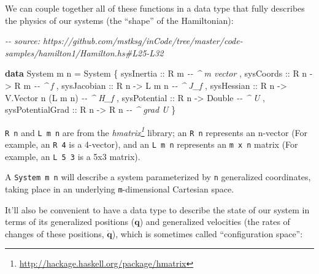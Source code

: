 \documentclass[]{article}
\newenvironment{Shaded}{}{}
\newcommand{\CommentTok}[1]{\textcolor[rgb]{0.38,0.63,0.69}{\textit{#1}}}
\newcommand{\DataTypeTok}[1]{\textcolor[rgb]{0.56,0.13,0.00}{#1}}
\newcommand{\KeywordTok}[1]{\textcolor[rgb]{0.00,0.44,0.13}{\textbf{#1}}}
\newcommand{\NormalTok}[1]{#1}
\newcommand{\OtherTok}[1]{\textcolor[rgb]{0.00,0.44,0.13}{#1}}
\renewcommand{\href}[2]{#2\footnote{\url{#1}}}
\begin{document}
We can couple together all of these functions in a data type that fully
describes the physics of our systems (the ``shape'' of the Hamiltonian):

\begin{Shaded}
\begin{Highlighting}[]
\CommentTok{{-}{-} source: https://github.com/mstksg/inCode/tree/master/code{-}samples/hamilton1/Hamilton.hs\#L25{-}L32}

\KeywordTok{data} \DataTypeTok{System}\NormalTok{ m n }\OtherTok{=} \DataTypeTok{System}
\NormalTok{    \{}\OtherTok{ sysInertia       ::} \DataTypeTok{R}\NormalTok{ m                         }\CommentTok{{-}{-} \^{} \textquotesingle{}m\textquotesingle{} vector}
\NormalTok{    ,}\OtherTok{ sysCoords        ::} \DataTypeTok{R}\NormalTok{ n }\OtherTok{{-}>} \DataTypeTok{R}\NormalTok{ m                  }\CommentTok{{-}{-} \^{} f}
\NormalTok{    ,}\OtherTok{ sysJacobian      ::} \DataTypeTok{R}\NormalTok{ n }\OtherTok{{-}>} \DataTypeTok{L}\NormalTok{ m n                }\CommentTok{{-}{-} \^{} J\_f}
\NormalTok{    ,}\OtherTok{ sysHessian       ::} \DataTypeTok{R}\NormalTok{ n }\OtherTok{{-}>} \DataTypeTok{V.Vector}\NormalTok{ n (}\DataTypeTok{L}\NormalTok{ m n)   }\CommentTok{{-}{-} \^{} H\_f}
\NormalTok{    ,}\OtherTok{ sysPotential     ::} \DataTypeTok{R}\NormalTok{ n }\OtherTok{{-}>} \DataTypeTok{Double}               \CommentTok{{-}{-} \^{} U}
\NormalTok{    ,}\OtherTok{ sysPotentialGrad ::} \DataTypeTok{R}\NormalTok{ n }\OtherTok{{-}>} \DataTypeTok{R}\NormalTok{ n                  }\CommentTok{{-}{-} \^{} grad U}
\NormalTok{    \}}
\end{Highlighting}
\end{Shaded}

\texttt{R\ n} and \texttt{L\ m\ n} are from the
\emph{\href{http://hackage.haskell.org/package/hmatrix}{hmatrix}} library; an
\texttt{R\ n} represents an n-vector (For example, an \texttt{R\ 4} is a
4-vector), and an \texttt{L\ m\ n} represents an \texttt{m\ x\ n} matrix (For
example, an \texttt{L\ 5\ 3} is a 5x3 matrix).

A \texttt{System\ m\ n} will describe a system parameterized by \texttt{n}
generalized coordinates, taking place in an underlying \texttt{m}-dimensional
Cartesian space.

It'll also be convenient to have a data type to describe the state of our system
in terms of its generalized positions (\(\mathbf{q}\)) and generalized
velocities (the rates of changes of these positions, \(\dot{\mathbf{q}}\)),
which is sometimes called ``configuration space'':
\end{document}
